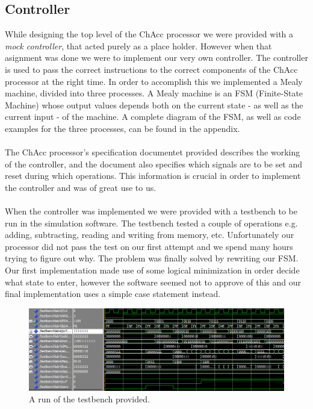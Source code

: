 \documentclass[a4paper,11pt]{article}
\begin{document}
\subsection{Controller}
While designing the top level of the ChAcc processor we were provided with a 
{\it mock controller}, that acted purely as a place holder. However when that 
asignment was done we were to implement our very own controller. The 
controller is used to pass the correct instructions to the correct components 
of the ChAcc processor at the right time. In order to accomplish this we 
implemented a Mealy machine, divided into three processes. A Mealy machine is 
an FSM (Finite-State Machine) whose output values depends both on the current 
state - as well as the current input - of the machine. A complete diagram of 
the FSM, as well as code examples for the three processes, can be found in 
the appendix.\\\\
\noindent
The ChAcc processor's specification documentet provided describes the working 
of the controller, and the document also specifies which signals are to be set 
and reset during which operations. This information is crucial in order to 
implement the controller and was of great use to us.\\\\
\noindent
When the controller was implemented we were provided with a testbench to be 
run in the simulation software. The testbench tested a couple of operations 
e.g. adding, subtracting, reading and writing from memory, etc. Unfortunately 
our processor did not pass the test on our first attempt and we spend many 
hours trying to figure out why. The problem was finally solved by rewriting 
our FSM. Our first implementation made use of some logical minimization in 
order decide what state to enter, however the software seemed not to approve 
of this and our final implementation uses a simple case statement instead.

\begin{figure}[h]
    \centering
    \includegraphics[width=\linewidth]{testbenchlab4.png}
    \caption{A run of the testbench provided.}
    \label{Memory}
\end{figure}
\noindent
\end{document}
